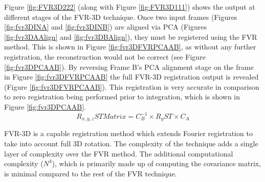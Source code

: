 Figure \ref{fig:FVR3D222} (along with Figure \ref{fig:FVR3D111}) shows the output at different stages of the FVR-3D technique. Once two input frames (Figures \ref{fig:fvr3DINA} and \ref{fig:fvr3DINB}) are aligned via PCA (Figures \ref{fig:fvr3DAAlign} and \ref{fig:fvr3DBAlign}), they must be registered using the FVR method. This is shown in Figure \ref{fig:fvr3DFVRPCAAB}, as without any further registration, the reconstruction would not be correct (see Figure \ref{fig:fvr3DPCAAB}). By reversing Frame B's PCA alignment stage on the frame in Figure \ref{fig:fvr3DFVRPCAAB} the full FVR-3D registration output is revealed (Figure \ref{fig:fvr3DFVRPCAAB}). This registration is very accurate in comparison to zero registration being performed prior to integration, which is shown in Figure \ref{fig:fvr3DPCAAB}. \\
 

\begin{equation} \label{eqn:FullRSTTransform}
R_{x,y,z}ST Matrix = C_{B}^{-1} \times R_{y}ST \times C_A
\end{equation}

FVR-3D is a capable registration method which extends Fourier registration to take into account full 3D rotation. The complexity of the technique adds a single layer of complexity over the FVR method. The additional computational complexity ($N^3$), which is primarily made up of computing the covariance matrix, is minimal compared to the rest of the FVR technique. \\


